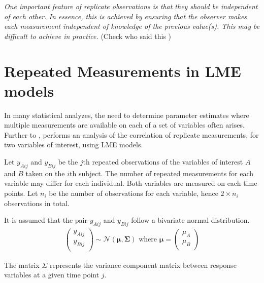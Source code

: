\documentclass[12pt, a4paper]{report}
\theoremstyle{plain}
\theoremstyle{definition}
\theoremstyle{remark}
\begin{document}
	
	
	\emph{
		One important feature of replicate observations is that they should be independent
		of each other. In essence, this is achieved by ensuring that the observer makes each
		measurement independent of knowledge of the previous value(s). This may be difficult
		to achieve in practice.} (Check who said this
	)
	
	

	\section{Repeated Measurements in LME models}
	
	In many statistical analyzes, the need to determine parameter estimates where multiple measurements are available on each of a set of variables often arises. Further to \citet{lam}, \citet{hamlett} performs an analysis of the correlation of replicate measurements, for two variables of interest, using LME models.
	
	Let $y_{Aij}$ and $y_{Bij}$ be the $j$th repeated observations of the variables of interest $A$ and $B$ taken on the $i$th subject. The number of repeated measurements for each variable may differ for each individual.
	Both variables are measured on each time points. Let $n_{i}$ be the number of observations for each variable, hence $2\times n_{i}$ observations in total.
	
	It is assumed that the pair $y_{Aij}$ and $y_{Bij}$ follow a bivariate normal distribution.
	\begin{eqnarray*}
		\left(
		\begin{array}{c}
			y_{Aij} \\
			y_{Bij} \\
		\end{array}
		\right) \sim \mathcal{N}(
		\boldsymbol{\mu}, \boldsymbol{\Sigma})\mbox{   where } \boldsymbol{\mu} = \left(
		\begin{array}{c}
			\mu_{A} \\
			\mu_{B} \\
		\end{array}
		\right)
	\end{eqnarray*}
	
	The matrix $\Sigma$ represents the variance component matrix between response variables at a given time point $j$.
	
\end{document}
